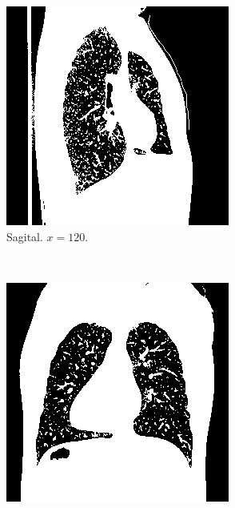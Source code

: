 \documentclass{article}
\begin{document}
\begin{figure}[H]
    \centering
    \begin{subfigure}[b]{0.3\textwidth}
        \includegraphics[width=\textwidth]{thorax/_neuroradiologist-sagital-gray.png}
        \caption{Sagital. $x=120$.}
    \end{subfigure}
    ~
    \begin{subfigure}[b]{0.3\textwidth}
        \includegraphics[width=\textwidth]{thorax/neuroradiologist-coronal-gray.png}

\end{subfigure}
\end{figure}
\end{document}
